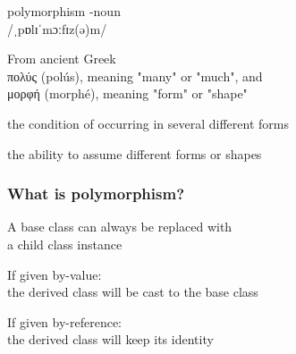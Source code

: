 \documentclass[14pt,a4paper,dvipsnames,usenames]{beamer}
\begin{document}
\begin{frame}

  {\Large polymorphism} \hspace{.2cm} {-noun}\\[2pt]
  {/ˌpɒlɪˈmɔːfɪz(ə)m/}

  \vspace{.4cm}
  {\fontsize{12pt}{12pt}\selectfont
  From ancient Greek\\[1pt]
  {πολύς} {(polús), meaning "many" or "much", and}\\
  {μορφή} {(morphé), meaning "form" or "shape"}
  }

  \vspace{.8cm}
  {\footnotesize {}}
  the condition of occurring in several different forms

  \vspace{.6cm}
  {\footnotesize {}}
  the ability to assume different forms or shapes
  
\end{frame}

\begin{frame}[fragile]
  \frametitle{What is polymorphism?}

  A base class can always be replaced with\\a child class instance

  \vspace{.8em}
  If given by-value:\\
  \hspace{.2cm} the derived class will be cast to the base class

  \vspace{.8em}
  If given by-reference:\\
  \hspace{.2cm} the derived class will {\color{FeebleWeek}keep its identity}

\end{frame}
\end{document}
